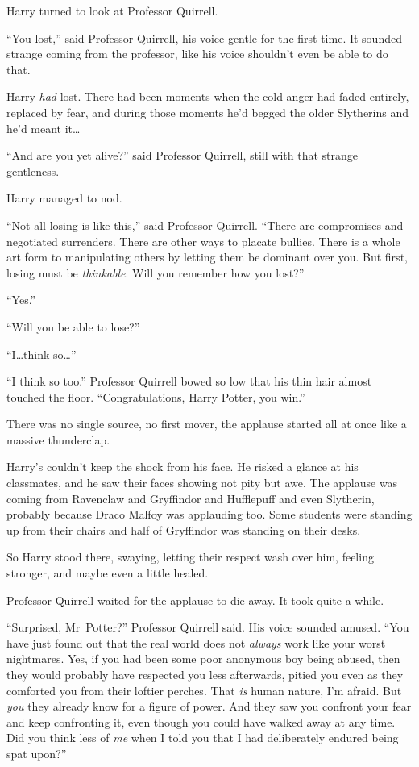 Harry turned to look at Professor Quirrell.

“You lost,” said Professor Quirrell, his voice gentle for the first time. It sounded strange coming from the professor, like his voice shouldn’t even be able to do that.

Harry \emph{had} lost. There had been moments when the cold anger had faded entirely, replaced by fear, and during those moments he’d begged the older Slytherins and he’d meant it…

“And are you yet alive?” said Professor Quirrell, still with that strange gentleness.

Harry managed to nod.

“Not all losing is like this,” said Professor Quirrell. “There are compromises and negotiated surrenders. There are other ways to placate bullies. There is a whole art form to manipulating others by letting them be dominant over you. But first, losing must be \emph{thinkable}. Will you remember how you lost?”

“Yes.”

“Will you be able to lose?”

“I…think so…”

“I think so too.” Professor Quirrell bowed so low that his thin hair almost touched the floor. “Congratulations, Harry Potter, you win.”

There was no single source, no first mover, the applause started all at once like a massive thunderclap.

Harry’s couldn’t keep the shock from his face. He risked a glance at his classmates, and he saw their faces showing not pity but awe. The applause was coming from Ravenclaw and Gryffindor and Hufflepuff and even Slytherin, probably because Draco Malfoy was applauding too. Some students were standing up from their chairs and half of Gryffindor was standing on their desks.

So Harry stood there, swaying, letting their respect wash over him, feeling stronger, and maybe even a little healed.

Professor Quirrell waited for the applause to die away. It took quite a while.

“Surprised, Mr~Potter?” Professor Quirrell said. His voice sounded amused. “You have just found out that the real world does not \emph{always} work like your worst nightmares. Yes, if you had been some poor anonymous boy being abused, then they would probably have respected you less afterwards, pitied you even as they comforted you from their loftier perches. That \emph{is} human nature, I’m afraid. But \emph{you} they already know for a figure of power. And they saw you confront your fear and keep confronting it, even though you could have walked away at any time. Did you think less of \emph{me} when I told you that I had deliberately endured being spat upon?”

